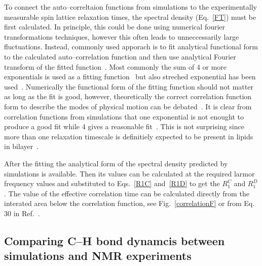 \documentclass[aps,prl,superscriptaddress,twocolumn]{revtex4}
\begin{document}
To connect the auto--correltaion functions from simulations to the experimentally measurable spin lattice relaxation times, the spectral density (Eq.~\ref{FT})
must be first calculated. In principle, this could be done using numerical fourier transformations techniques, 
however this often leads to unneccessarily large fluctuations. Instead, commonly used apporach is to fit 
analytical functional form to the calculated auto--correlation function and then use analytical Fourier
transform of the fitted function~\cite{pastor88,lindahl01,pastor02,wohlert06,ferreira15}. Most commonly 
the sum of 4 or more exponentials is used as a fitting function~\cite{pastor88,venable93,pastor02,eldho03,ollila07a,ferreira15} but
also streched exponential has been used~\cite{lindahl01,wohlert06}. Numerically the functional form of the fitting function should not matter as
long as the fit is good, however, theoretically the correct correlation function form to describe the modes of
physical motion can be debated~\cite{leftin11,wohlert06,edholm08,klauda08a,klauda08c}. It is clear from correlation functions from simulations that one exponential 
is not enought to produce a good fit while 4 gives a reasonable fit~\cite{eldho03}. This is not surprising since more
than one relaxation timescale is definitiely expected to be present in lipids in bilayer~\cite{pastor88,venable93,pastor02,leftin11}.

After the fitting the analytical form of the spectral density predicted by simulations is available.
Then its values can be calculated at the required larmor frequency values and substituted to Eqs.~\ref{R1C}
and~\ref{R1D} to get the $R_{1}^{C}$ and $R_{1}^{D}$. The value of the effective correlation time can be
calculated directly from the interated area below the correlation function, see Fig.~\ref{correlationF} or from 
Eq. 30 in Ref.~\cite{ferreira15}.




\subsection{Comparing C--H bond dynamcis between simulations and NMR experiments}
\end{document}
